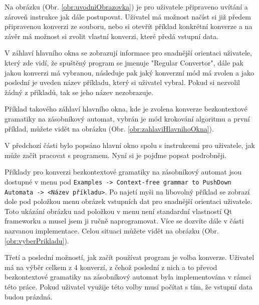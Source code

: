 
Na obrázku (Obr. \ref{obr:uvodniObrazovka}) je pro uživatele připraveno uvítání a zároveň instrukce jak dále postupovat. Uživatel má možnost načíst si již předem připravenou konverzi ze souboru, nebo si otevřít příklad konkrétní konverze a na závěr má možnost si zvolit vlastní konverzi, které předá vstupní data.



V záhlaví hlavního okna se zobrazují informace pro snadnější orientaci uživatele, který zde vidí, že spuštěný program se jmenuje "Regular Convertor", dále pak jakou konverzi má vybranou, následuje pak jaký konverzní mód má zvolen a jako poslední je uveden název příkladu, který si uživatel vybral. Pokud si nezvolil žádný z příkladů, tak se jeho název nezobrazuje.

Příklad takového záhlaví hlavního okna, kde je zvolena konverze bezkontextové gramatiky na zásobníkový automat, vybrán je mód krokování algoritmu a první příklad, můžete vidět na obrázku (Obr. \ref{obr:zahlaviHlavnihoOkna}).



V předchozí části bylo popsáno hlavní okno spolu s instrukcemi pro uživatele, jak může začít pracovat s programem. Nyní si je pojďme popsat podrobněji.


Příklady pro konverzi bezkontextové gramatiky na zásobníkový automat jsou dostupné v menu pod \texttt{Examples -> Context-free grammar to PushDown Automata -> <Název příkladu>}. Po najetí myši na libovolný příklad se zobrazí dole pod položkou menu obrázek vstupních dat pro snadnější orientaci uživatele. Toto ukázání obrázku nad položkou v menu není standardní vlastností Qt frameworku a musel jsem ji ručně naprogramovat. Více se dozvíte dále v části nazvanou implementace. Celou situaci můžete vidět na obrázku (Obr. \ref{obr:vyberPrikladu}).



Třetí a poslední možností, jak začít používat program je volba konverze. Uživatel má na výběr celkem z 4 konverzí, z čehož poslední z nich a to převod bezkontextové gramatiky na zásobníkový automat byla implementována v rámci této práce. Pokud uživatel využije této volby musí počítat s tím, že vstupní data budou prázdná.

